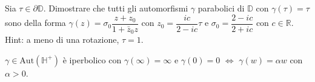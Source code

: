 \begin{exc}
  Sia $\tau \in \partial\mathbb{D}$. Dimostrare che tutti gli automorfismi $\gamma$ parabolici di $\mathbb{D}$ con $\gamma(\tau)=\tau$ sono della forma $\gamma(z)=\sigma_0\dfrac{z+z_0}{1+\bar{z}_0z}$ con $z_0=\dfrac{ic}{2-ic}\tau$ e $\sigma_0=\dfrac{2-ic}{2+ic}$ con $c \in \mathbb{R}$.
  Hint: a meno di una rotazione, $\tau=1$.
\end{exc}

\begin{ex}
  $\gamma \in \text{Aut}(\mathbb{H}^+)$ è iperbolico con $\gamma(\infty)=\infty$ e $\gamma(0)=0$ $\iff$ $\gamma(w)=\alpha w$ con $\alpha>0$.
\end{ex}
